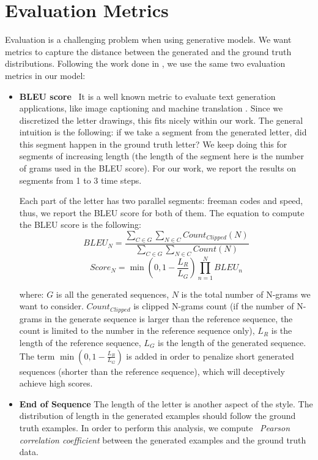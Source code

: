 \documentclass[conference]{IEEEtran}
\begin{document}
\section{Evaluation Metrics} \label{sec:evaluation}
\par Evaluation is a challenging problem when using generative models. We want metrics to capture the distance between the generated and the ground truth distributions. Following the work done in \cite{mohammed2018DTL}, we use the same two evaluation metrics in our model:
\begin{itemize}
    \item \textbf{BLEU score}~\cite{papineni2002bleu} It is a well known metric to evaluate text generation applications, like image captioning \cite{karpathy2015deep,vinyals2015show} and machine translation \cite{Sutskever:2014:SSL:2969033.2969173}. Since we discretized the letter drawings, this fits nicely within our work. The general intuition is the following: if we take a segment from the generated letter, did this segment happen in the ground truth letter? We keep doing this for segments of increasing length (the length of the segment here is the number of grams used in the BLEU score). For our work, we report the results on segments from 1 to 3 time steps.
    
    Each part of the letter has two parallel segments: freeman codes and speed, thus, we report the BLEU score for both of them. 
    The equation to compute the BLEU score is the following:
    \begin{equation}
    BLEU_{N} = \frac{\sum_{C\in G}\sum_{N\in C}Count_{Clipped}(N)}{\sum_{C\in G}\sum_{N\in C}Count(N)}
    \end{equation}
    \begin{equation}
    Score_{N} = \min{(0, 1 - \frac{L_{R}}{L_{G}})} \prod^{N}_{n=1}BLEU_{n}
    \end{equation}
    
    where: $G$ is all the generated sequences, $N$ is the total number of N-grams we want to consider. $Count_{Clipped}$ is clipped N-grams count (if the number of N-grams in the generate sequence is larger than the reference sequence, the count is limited to the number in the reference sequence only), $L_R$ is the length of the reference sequence, $L_G$ is the length of the generated sequence. 
    The term $\min(0, 1 - \frac{L_{R}}{L_{G}})$ is added in order to penalize short generated sequences (shorter than the reference sequence), which will deceptively achieve high scores.
    
    \item \textbf{End of Sequence} The length of the letter is another aspect of the style. The distribution of length in the generated examples should follow the ground truth examples. In order to perform this analysis, we compute ~\textit{Pearson correlation coefficient} between the generated examples and the ground truth data.
\end{itemize}
\end{document}

